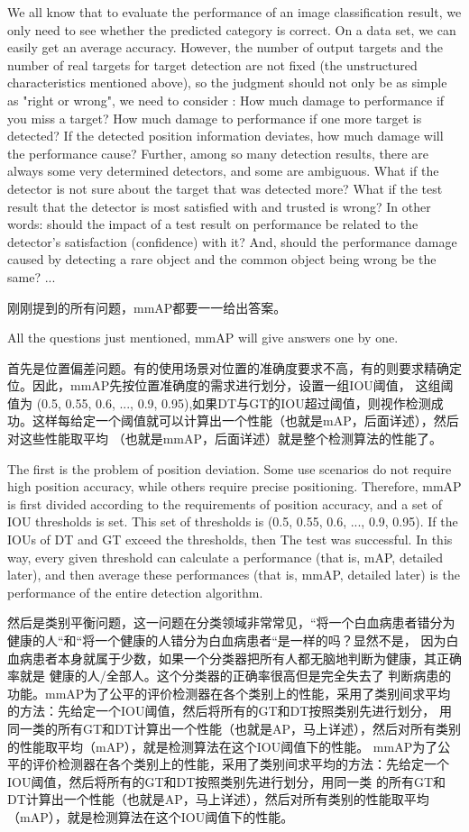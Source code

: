 \documentclass[UTF8]{ctexart}
\begin{document}
We all know that to evaluate the performance of an image classification result, we only need to see whether 
the predicted category is correct. On a data set, we can easily get an average accuracy.
However, the number of output targets and the number of real targets for target detection are not fixed 
(the unstructured characteristics mentioned above), so the judgment should not only be as simple as "right or wrong", 
we need to consider : How much damage to performance if you miss a target? How much damage to performance if one more 
target is detected? If the detected position information deviates, how much damage will the performance cause? Further, 
among so many detection results, there are always some very determined detectors, and some are ambiguous. What if the 
detector is not sure about the target that was detected more? What if the test result that the detector is most satisfied 
with and trusted is wrong? In other words: should the impact of a test result on performance be related to the detector's 
satisfaction (confidence) with it? And, should the performance damage caused by detecting a rare object and the common 
object being wrong be the same? ...

刚刚提到的所有问题，mmAP都要一一给出答案。

All the questions just mentioned, mmAP will give answers one by one.

首先是位置偏差问题。有的使用场景对位置的准确度要求不高，有的则要求精确定位。因此，mmAP先按位置准确度的需求进行划分，设置一组IOU阈值，
这组阈值为 (0.5, 0.55, 0.6, ..., 0.9,
0.95),如果DT与GT的IOU超过阈值，则视作检测成功。这样每给定一个阈值就可以计算出一个性能（也就是mAP，后面详述），然后对这些性能取平均
（也就是mmAP，后面详述）就是整个检测算法的性能了。

The first is the problem of position deviation. Some use scenarios do not require high position accuracy, while others 
require precise positioning. Therefore, mmAP is first divided according to the requirements of position accuracy, 
and a set of IOU thresholds is set. This set of thresholds is (0.5, 0.55, 0.6, ..., 0.9, 0.95). If the IOUs of DT 
and GT exceed the thresholds, then The test was successful. In this way, every given threshold can calculate a performance 
(that is, mAP, detailed later), and then average these performances (that is, mmAP, detailed later) is the performance of 
the entire detection algorithm.

然后是类别平衡问题，这一问题在分类领域非常常见，“将一个白血病患者错分为健康的人“和“将一个健康的人错分为白血病患者“是一样的吗？显然不是，
因为白血病患者本身就属于少数，如果一个分类器把所有人都无脑地判断为健康，其正确率就是 健康的人/全部人。这个分类器的正确率很高但是完全失去了
判断病患的功能。mmAP为了公平的评价检测器在各个类别上的性能，采用了类别间求平均的方法：先给定一个IOU阈值，然后将所有的GT和DT按照类别先进行划分，
用同一类的所有GT和DT计算出一个性能（也就是AP，马上详述），然后对所有类别的性能取平均（mAP），就是检测算法在这个IOU阈值下的性能。
mmAP为了公平的评价检测器在各个类别上的性能，采用了类别间求平均的方法：先给定一个IOU阈值，然后将所有的GT和DT按照类别先进行划分，用同一类
的所有GT和DT计算出一个性能（也就是AP，马上详述），然后对所有类别的性能取平均（mAP），就是检测算法在这个IOU阈值下的性能。
\end{document}
